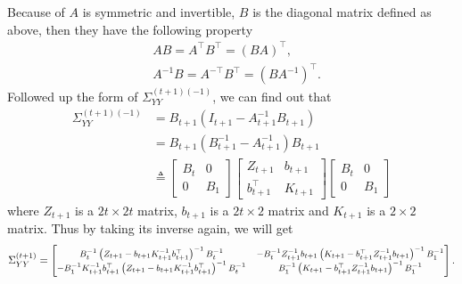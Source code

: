 Because of $A$ is symmetric and invertible, $B$ is the diagonal matrix defined as above, then they have the following property 
\begin{align*}
& AB=A^\top B^\top = \left(BA\right)^\top, \\
& A^{-1}B = A^{-\top}B^\top = \left(BA^{-1}\right)^\top. 
\end{align*}
Followed up the form of $\Sigma_{YY}^{\left(t+1\right) \left(-1\right)}$, we can find out that 
\begin{align*}
\Sigma_{YY}^{\left(t+1\right) \left(-1\right)} &= B_{t+1}\left(I_{t+1}-A_{t+1}^{-1}B_{t+1}\right) \\
&= B_{t+1}\left(B_{t+1}^{-1}-A_{t+1}^{-1}\right)B_{t+1} \\
&\triangleq \begin{bmatrix} 
B_t & 0 \\ 0 & B_1 \end{bmatrix}
\begin{bmatrix} 
Z_{t+1} & b_{t+1} \\
b_{t+1}^\top & K_{t+1}
\end{bmatrix} \begin{bmatrix} 
B_t & 0 \\ 0 & B_1\end{bmatrix}
\end{align*}
where $Z_{t+1}$ is a $2t \times 2t$ matrix, $ b_{t+1} $ is a $2t \times 2$ matrix and $K_{t+1}$ is a $2 \times 2$ matrix. Thus by taking its inverse again, we will get 
\begin{align*} \footnotesize \Sigma_{YY}^{\left(t+1\right)}= \left[ \begin{matrix}
B_t^{-1} \left(Z_{t+1}-b_{t+1}K_{t+1}^{-1}b_{t+1}^\top\right)^{-1}B_t^{-1}  & - B_t^{-1}  Z_{t+1}^{-1}b_{t+1}\left(K_{t+1}-b_{t+1}^\top Z_{t+1}^{-1}b_{t+1}\right)^{-1}B_1^{-1} \\
-B_1^{-1}  K_{t+1}^{-1}b_{t+1}^\top \left(Z_{t+1}-b_{t+1}K_{t+1}^{-1}b_{t+1}^\top\right)^{-1}B_t^{-1}  & B_1^{-1}  \left(K_{t+1}-b_{t+1}^\top Z_{t+1}^{-1}b_{t+1}\right)^{-1}B_1^{-1} 
\end{matrix}\right].
\end{align*}

